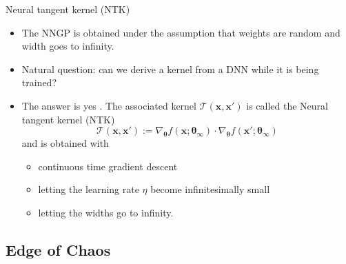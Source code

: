 \documentclass[9pt,handout]{beamer}
\begin{document}
\begin{frame}{Neural tangent kernel (NTK)}
\begin{itemize}
	\item The NNGP is obtained under the assumption that weights are random and width goes to infinity.
	\item Natural question: can we derive a kernel from a DNN while it is being trained?
	\item The answer is yes \citep{jacot2018neural}. The associated kernel $\mathcal{T}(\boldsymbol{x},\boldsymbol{x}')$ is called the \alert{Neural tangent kernel} (NTK)
	$$\mathcal{T}(\boldsymbol{x},\boldsymbol{x}') := \nabla_{\boldsymbol{\theta}}f(\boldsymbol{x}; \boldsymbol{\theta_\infty})\cdot \nabla_{\boldsymbol{\theta}}f(\boldsymbol{x}'; \boldsymbol{\theta_\infty})$$
	and is obtained with 
	\begin{itemize}
		\item continuous time gradient descent
		\item letting the learning rate $\eta$ become infinitesimally small
		\item letting the widths go to infinity.
	\end{itemize}
\end{itemize}
\end{frame}



\subsection{Edge of Chaos}
\end{document}
